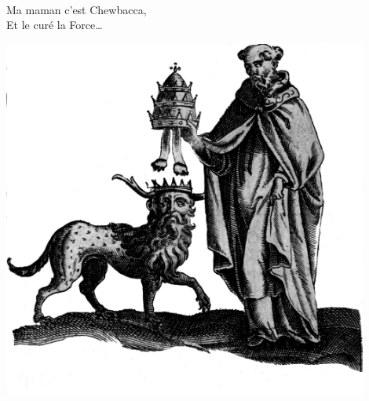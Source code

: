 \\Ma maman c’est Chewbacca, \bissimple
\\Et le curé la Force… \bissimple
\bigskip
\begin{center}
\includegraphics[width=0.9\textwidth]{images/brev38.png}
\end{center}

\breakpage